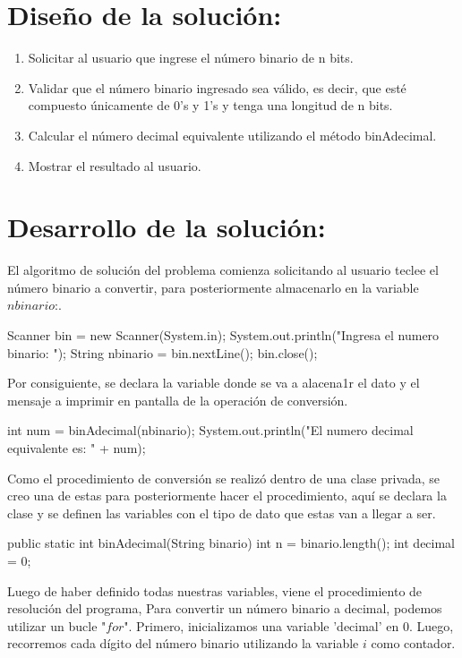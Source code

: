 \documentclass{IEEEcsmag}
\begin{document}
\section*{Diseño de la solución:}
\begin{enumerate}
    \item Solicitar al usuario que ingrese el número binario de n bits.
    \item Validar que el número binario ingresado sea válido, es decir, que esté compuesto únicamente de 0's y 1's y tenga una longitud de n bits.
    \item Calcular el número decimal equivalente utilizando el método binAdecimal.
    \item Mostrar el resultado al usuario.
\end{enumerate}

\section*{Desarrollo de la solución:}
El algoritmo de solución del problema comienza solicitando al usuario teclee el número binario a convertir, para posteriormente almacenarlo en la variable $nbinario$:.
\begin{javaCode}
Scanner bin = new Scanner(System.in);
    System.out.println("Ingresa el numero binario: ");
    String nbinario = bin.nextLine();
    bin.close();
\end{javaCode}

Por consiguiente, se declara la variable donde se va a alacena1r el dato y el mensaje a imprimir en pantalla de la operación de conversión.

\begin{javaCode}
int num = binAdecimal(nbinario);
System.out.println("El numero decimal equivalente es: " + num);

\end{javaCode}

Como el procedimiento de conversión se realizó dentro de una clase privada, se creo una de estas para posteriormente hacer el procedimiento, aquí se declara la clase y se definen las variables con el tipo de dato que estas van a llegar a ser.

\begin{javaCode}
public static int binAdecimal(String binario){
    int n = binario.length();
    int decimal = 0;
    }
\end{javaCode}

Luego de haber definido todas nuestras variables, viene el procedimiento de resolución del programa, Para convertir un número binario a decimal, podemos utilizar un bucle "$for$". Primero, inicializamos una variable 'decimal' en 0. Luego, recorremos cada dígito del número binario utilizando la variable $i$ como contador.
\end{document}
